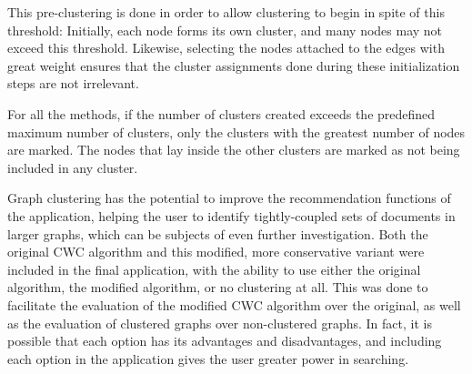 This pre-clustering is done in order to allow clustering to begin in spite of this threshold: Initially, each node forms its own cluster, and many nodes may not exceed this threshold. Likewise, selecting the nodes attached to the edges with great weight ensures that the cluster assignments done during these initialization steps are not irrelevant.


For all the methods, if the number of clusters created exceeds the predefined maximum number of clusters, only the clusters with the greatest number of nodes are marked. The nodes that lay inside the other clusters are marked as not being included in any cluster.

Graph clustering has the potential to improve the recommendation functions of the application, helping the user to identify tightly-coupled sets of documents in larger graphs, which can be subjects of even further investigation. Both the original CWC algorithm and this modified, more conservative variant were included in the final application, with the ability to use either the original algorithm, the modified algorithm, or no clustering at all. This was done to facilitate the evaluation of the modified CWC algorithm over the original, as well as the evaluation of clustered graphs over non-clustered graphs. In fact, it is possible that each option has its advantages and disadvantages, and including each option in the application gives the user greater power in searching.
